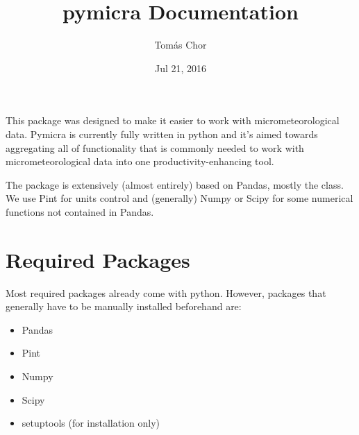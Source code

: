 \documentclass[a4paper,10pt,english]{sphinxmanual}
\title{pymicra Documentation}
\date{Jul 21, 2016}
\author{Tomás Chor}
\begin{document}
\maketitle
\tableofcontents
{}\label{index::doc}


This package was designed to make it easier to work with
micrometeorological data. Pymicra is currently fully written in python
and it's aimed towards aggregating all of functionality that is commonly
needed to work with micrometeorological data into one
productivity-enhancing tool.

The package is extensively (almost entirely) based on Pandas, mostly the
 class. We use Pint for units control and
(generally) Numpy or Scipy for some numerical functions not contained in
Pandas.


\chapter{Required Packages}
\label{index:pymicra-a-python-tool-for-micrometeorological-analyses}\label{index:required-packages}
Most required packages already come with python. However, packages that
generally have to be manually installed beforehand are:
\begin{itemize}
\item {} 
Pandas

\item {} 
Pint

\item {} 
Numpy

\item {} 
Scipy

\item {} 
setuptools (for installation only)

\end{itemize}
\end{document}
